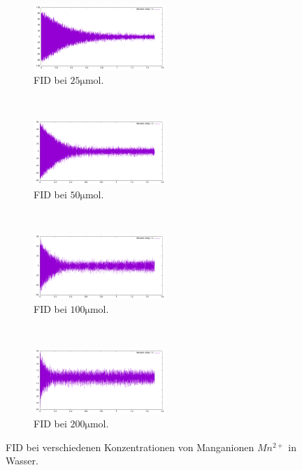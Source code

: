 \documentclass{subfiles}
\begin{document}
    \begin{figure}
        \centering
        \begin{subfigure}[b]{0.4\textwidth}
            \centering
            \includegraphics[width=5cm]{Live-Dokumente/Bilder/FID-11/FID_25.png}
            \caption{FID bei $25\si{\micro\mol}$.}
        \end{subfigure}
        \
        \begin{subfigure}[b]{0.4\textwidth}
            \centering
            \includegraphics[width=5cm]{Live-Dokumente/Bilder/FID-11/FID_50.png}
            \caption{FID bei $50\si{\micro\mol}$.}
        \end{subfigure}
        \
        \begin{subfigure}[b]{0.4\textwidth}
            \centering
            \includegraphics[width=5cm]{Live-Dokumente/Bilder/FID-11/FID_100.png}
            \caption{FID bei $100\si{\micro\mol}$.}
        \end{subfigure}
        \
        \begin{subfigure}[b]{0.4\textwidth}
            \centering
            \includegraphics[width=5cm]{Live-Dokumente/Bilder/FID-11/FID_200.png}
            \caption{FID bei $200\si{\micro\mol}$.}
        \end{subfigure}
        \caption{FID bei verschiedenen Konzentrationen von Manganionen $Mn^{2+}$ in Wasser.}
    \end{figure}
\end{document}
